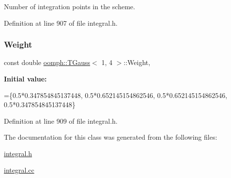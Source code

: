 Number of integration points in the scheme. 



Definition at line 907 of file integral.\+h.

\mbox{\label{classoomph_1_1TGauss_3_011_00_014_01_4_a4d1975be33c55bf2450c540f9c4b50a9}} 
\subsubsection{\texorpdfstring{Weight}{Weight}}
{\footnotesize\ttfamily const double \hyperlink{classoomph_1_1TGauss}{oomph\+::\+T\+Gauss}$<$ 1, 4 $>$\+::Weight\hspace{0.3cm}{\ttfamily [static]}, {\ttfamily [private]}}

{\bfseries Initial value\+:}
\begin{DoxyCode}
=\{0.5*0.347854845137448, 
0.5*0.652145154862546, 0.5*0.652145154862546, 0.5*0.347854845137448\}
\end{DoxyCode}


Definition at line 909 of file integral.\+h.



The documentation for this class was generated from the following files\+:\begin{DoxyCompactItemize}
\item 
\hyperlink{integral_8h}{integral.\+h}\item 
\hyperlink{integral_8cc}{integral.\+cc}\end{DoxyCompactItemize}
